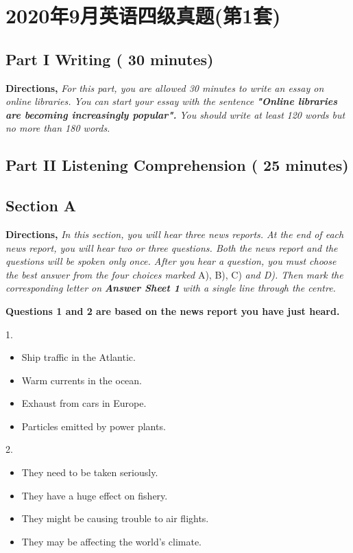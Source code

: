 \documentclass[UTF8,11pt]{ctexart}
\begin{document}
\section*{2020年9月英语四级真题(第1套)}
\subsection*{\textbf{Part I} \textbf{Writing} \textbf{( 30 minutes)}}


\textbf{Directions, }\textit{For this part, you are allowed 30 minutes to write an essay on online libraries. You can start} \textit{your essay with the sentence }\textbf{\textit{"Online libraries are becoming increasingly popular". }}\textit{You should write at least} \textit{120 words but no more than 180 words.}


\subsection*{\textbf{Part }II \textbf{Listening Comprehension} \textbf{( 25 minutes)}}


\subsection*{\textbf{Section A}}


\textbf{Directions, }\textit{In this section, you will hear three news reports. At the end of each news report, you will hear} \textit{two or three questions. Both the news report and the questions will be spoken only once. After you hear a} \textit{question, you must choose the best answer from the four choices marked }A), B), C) \textit{and D). Then mark} \textit{the corresponding letter on }\textbf{\textit{Answer Sheet 1 }}\textit{with a single line through the centre.}


\textbf{Questions 1 and 2 are based on the news report you have just heard.}


1.


\begin{itemize}[leftmargin=2em,itemsep=.2em,topsep=.4em]\item[A.] Ship traffic in the Atlantic.
\item[B.] Warm currents in the ocean.
\item[C.] Exhaust from cars in Europe.
\item[D.] Particles emitted by power plants.
\end{itemize}

2.


\begin{itemize}[leftmargin=2em,itemsep=.2em,topsep=.4em]\item[A.] They need to be taken seriously.
\item[B.] They have a huge effect on fishery.
\item[C.] They might be causing trouble to air flights.
\item[D.] They may be affecting the world's climate.
\end{itemize}
\end{document}

